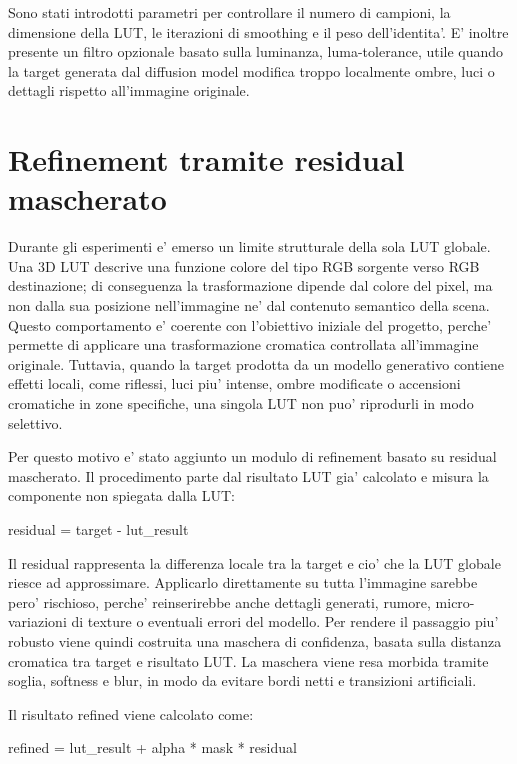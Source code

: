 \documentclass[12pt,a4paper]{report}
\renewcommand{\texttt}[1]{{\normalfont #1}}
\begin{document}
Sono stati introdotti parametri per controllare il numero di campioni, la dimensione della LUT, le iterazioni di smoothing e il peso dell'identita'. E' inoltre presente un filtro opzionale basato sulla luminanza, \texttt{luma-tolerance}, utile quando la target generata dal diffusion model modifica troppo localmente ombre, luci o dettagli rispetto all'immagine originale.

\section{Refinement tramite residual mascherato}

Durante gli esperimenti e' emerso un limite strutturale della sola LUT globale. Una 3D LUT descrive una funzione colore del tipo RGB sorgente verso RGB destinazione; di conseguenza la trasformazione dipende dal colore del pixel, ma non dalla sua posizione nell'immagine ne' dal contenuto semantico della scena. Questo comportamento e' coerente con l'obiettivo iniziale del progetto, perche' permette di applicare una trasformazione cromatica controllata all'immagine originale. Tuttavia, quando la target prodotta da un modello generativo contiene effetti locali, come riflessi, luci piu' intense, ombre modificate o accensioni cromatiche in zone specifiche, una singola LUT non puo' riprodurli in modo selettivo.

Per questo motivo e' stato aggiunto un modulo di refinement basato su residual mascherato. Il procedimento parte dal risultato LUT gia' calcolato e misura la componente non spiegata dalla LUT:

\begin{center}
    \texttt{residual = target - lut\_result}
\end{center}

Il residual rappresenta la differenza locale tra la target e cio' che la LUT globale riesce ad approssimare. Applicarlo direttamente su tutta l'immagine sarebbe pero' rischioso, perche' reinserirebbe anche dettagli generati, rumore, micro-variazioni di texture o eventuali errori del modello. Per rendere il passaggio piu' robusto viene quindi costruita una maschera di confidenza, basata sulla distanza cromatica tra target e risultato LUT. La maschera viene resa morbida tramite soglia, softness e blur, in modo da evitare bordi netti e transizioni artificiali.

Il risultato refined viene calcolato come:

\begin{center}
    \texttt{refined = lut\_result + alpha * mask * residual}
\end{center}
\end{document}
